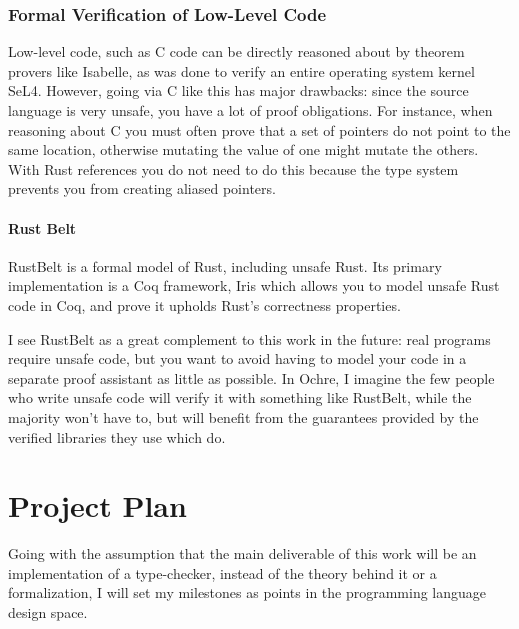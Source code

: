 \documentclass[12pt,twoside]{report}
\begin{document}
\subsection{Formal Verification of Low-Level Code}
Low-level code, such as C code can be directly reasoned about by theorem provers like Isabelle, as was done to verify an entire operating system kernel SeL4\cite{klein_sel4_2009}. However, going via C like this has major drawbacks: since the source language is very unsafe, you have a lot of proof obligations. For instance, when reasoning about C you must often prove that a set of pointers do not point to the same location, otherwise mutating the value of one might mutate the others. With Rust references you do not need to do this because the type system prevents you from creating aliased pointers.

\subsubsection{Rust Belt}
RustBelt\cite{jung_rustbelt_2018} is a formal model of Rust, including unsafe Rust. Its primary implementation is a Coq framework, Iris\cite{noauthor_iris_nodate} which allows you to model unsafe Rust code in Coq, and prove it upholds Rust's correctness properties.

I see RustBelt as a great complement to this work in the future: real programs require unsafe code, but you want to avoid having to model your code in a separate proof assistant as little as possible. In Ochre, I imagine the few people who write unsafe code will verify it with something like RustBelt, while the majority won't have to, but will benefit from the guarantees provided by the verified libraries they use which do.

\chapter{Project Plan}
Going with the assumption that the main deliverable of this work will be an implementation of a type-checker, instead of the theory behind it or a formalization, I will set my milestones as points in the programming language design space.


\renewcommand{\arraystretch}{1.7}
\end{document}
